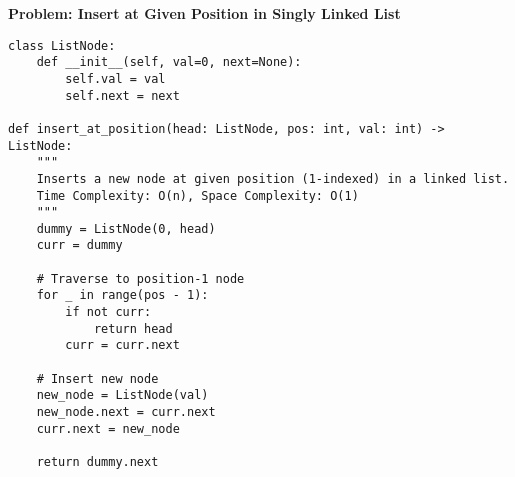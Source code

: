 % 
% 

\noindent\textbf{Problem: Insert at Given Position in Singly Linked List}
\begin{verbatim}
class ListNode:
    def __init__(self, val=0, next=None):
        self.val = val
        self.next = next

def insert_at_position(head: ListNode, pos: int, val: int) -> ListNode:
    """
    Inserts a new node at given position (1-indexed) in a linked list.
    Time Complexity: O(n), Space Complexity: O(1)
    """
    dummy = ListNode(0, head)
    curr = dummy
    
    # Traverse to position-1 node
    for _ in range(pos - 1):
        if not curr:
            return head
        curr = curr.next
    
    # Insert new node
    new_node = ListNode(val)
    new_node.next = curr.next
    curr.next = new_node
    
    return dummy.next
\end{verbatim}


